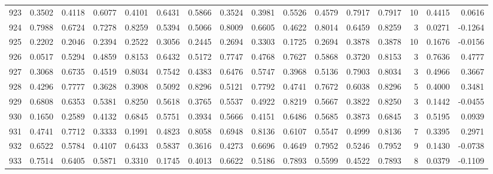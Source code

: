 \begin{tabular}{lrrrrrrrrrrrrrrr}
923 &      0.3502 &  0.4118 &  0.6077 &  0.4101 &  0.6431 &  0.5866 &  0.3524 &  0.3981 &  0.5526 &  0.4579 &   0.7917 &     0.7917 &     10 &                    0.4415 &                     0.0616 \\
924 &      0.7988 &  0.6724 &  0.7278 &  0.8259 &  0.5394 &  0.5066 &  0.8009 &  0.6605 &  0.4622 &  0.8014 &   0.6459 &     0.8259 &      3 &                    0.0271 &                    -0.1264 \\
925 &      0.2202 &  0.2046 &  0.2394 &  0.2522 &  0.3056 &  0.2445 &  0.2694 &  0.3303 &  0.1725 &  0.2694 &   0.3878 &     0.3878 &     10 &                    0.1676 &                    -0.0156 \\
926 &      0.0517 &  0.5294 &  0.4859 &  0.8153 &  0.6432 &  0.5172 &  0.7747 &  0.4768 &  0.7627 &  0.5868 &   0.3720 &     0.8153 &      3 &                    0.7636 &                     0.4777 \\
927 &      0.3068 &  0.6735 &  0.4519 &  0.8034 &  0.7542 &  0.4383 &  0.6476 &  0.5747 &  0.3968 &  0.5136 &   0.7903 &     0.8034 &      3 &                    0.4966 &                     0.3667 \\
928 &      0.4296 &  0.7777 &  0.3628 &  0.3908 &  0.5092 &  0.8296 &  0.5121 &  0.7792 &  0.4741 &  0.7672 &   0.6038 &     0.8296 &      5 &                    0.4000 &                     0.3481 \\
929 &      0.6808 &  0.6353 &  0.5381 &  0.8250 &  0.5618 &  0.3765 &  0.5537 &  0.4922 &  0.8219 &  0.5667 &   0.3822 &     0.8250 &      3 &                    0.1442 &                    -0.0455 \\
930 &      0.1650 &  0.2589 &  0.4132 &  0.6845 &  0.5751 &  0.3934 &  0.5666 &  0.4151 &  0.6486 &  0.5685 &   0.3873 &     0.6845 &      3 &                    0.5195 &                     0.0939 \\
931 &      0.4741 &  0.7712 &  0.3333 &  0.1991 &  0.4823 &  0.8058 &  0.6948 &  0.8136 &  0.6107 &  0.5547 &   0.4999 &     0.8136 &      7 &                    0.3395 &                     0.2971 \\
932 &      0.6522 &  0.5784 &  0.4107 &  0.6433 &  0.5837 &  0.3616 &  0.4273 &  0.6696 &  0.4649 &  0.7952 &   0.5246 &     0.7952 &      9 &                    0.1430 &                    -0.0738 \\
933 &      0.7514 &  0.6405 &  0.5871 &  0.3310 &  0.1745 &  0.4013 &  0.6622 &  0.5186 &  0.7893 &  0.5599 &   0.4522 &     0.7893 &      8 &                    0.0379 &                    -0.1109 \\

\end{tabular}
